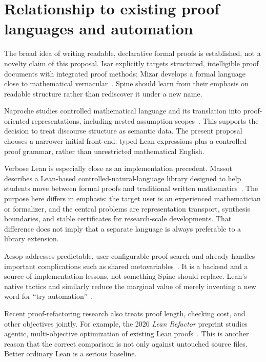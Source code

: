\documentclass[11pt,letterpaper]{article}
\theoremstyle{definition}
\theoremstyle{remark}
\newcommand{\Spine}{Spine}
\newcommand{\code}[1]{\texttt{\detokenize{#1}}}
\begin{document}
\section{Relationship to existing proof languages and automation}
\label{sec:prior}
The broad idea of writing readable, declarative formal proofs is established, not a novelty claim of this proposal. Isar explicitly targets structured, intelligible proof documents with integrated proof methods; Mizar develops a formal language close to mathematical vernacular~\cite{isar,mizar}. \Spine{} should learn from their emphasis on readable structure rather than rediscover it under a new name.

Naproche studies controlled mathematical language and its translation into proof-oriented representations, including nested assumption scopes~\cite{naproche}. This supports the decision to treat discourse structure as semantic data. The present proposal chooses a narrower initial front end: typed Lean expressions plus a controlled proof grammar, rather than unrestricted mathematical English.

Verbose Lean is especially close as an implementation precedent. Massot describes a Lean-based controlled-natural-language library designed to help students move between formal proofs and traditional written mathematics~\cite{verbose}. The purpose here differs in emphasis: the target user is an experienced mathematician or formalizer, and the central problems are representation transport, synthesis boundaries, and stable certificates for research-scale developments. That difference does not imply that a separate language is always preferable to a library extension.

Aesop addresses predictable, user-configurable proof search and already handles important complications such as shared metavariables~\cite{aesop}. It is a backend and a source of implementation lessons, not something \Spine{} should replace. Lean's native tactics and \code{grind} similarly reduce the marginal value of merely inventing a new word for ``try automation''~\cite{lean-tactics,lean-grind}.

Recent proof-refactoring research also treats proof length, checking cost, and other objectives jointly. For example, the 2026 \emph{Lean Refactor} preprint studies agentic, multi-objective optimization of existing Lean proofs~\cite{lean-refactor}. This is another reason that the correct comparison is not only against untouched source files. Better ordinary Lean is a serious baseline.
\end{document}
